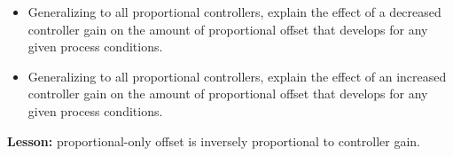 \begin{itemize}
\item{} Generalizing to all proportional controllers, explain the effect of a decreased controller gain on the amount of proportional offset that develops for any given process conditions.
\item{} Generalizing to all proportional controllers, explain the effect of an increased controller gain on the amount of proportional offset that develops for any given process conditions.
\end{itemize}














{\bf Lesson:} proportional-only offset is inversely proportional to controller gain.




